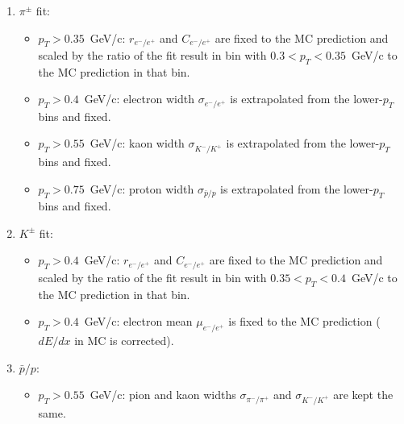 \begin{enumerate}
	\item $\pi^\pm$ fit:
	\begin{itemize}
		\item $p_T>0.35$~GeV/c: $r_{e^-/e^+}$ and $C_{e^-/e^+}$ are fixed to the MC prediction and scaled by the ratio of the fit result in bin with $0.3 < p_T < 0.35$~GeV/c to the MC prediction in that bin.
		\item $p_T>0.4$~GeV/c: electron width $\sigma_{e^-/e^+}$ is extrapolated from the lower-$p_T$ bins and fixed.
		\item $p_T>0.55$~GeV/c: kaon width $\sigma_{K^-/K^+}$ is extrapolated from the lower-$p_T$ bins and fixed.
		\item $p_T>0.75$~GeV/c: proton width $\sigma_{\bar{p}/p}$ is extrapolated from the lower-$p_T$ bins and fixed.
	\end{itemize}
	\item $K^\pm$ fit:
	\begin{itemize}
		\item $p_T>0.4$~GeV/c: $r_{e^-/e^+}$ and $C_{e^-/e^+}$ are fixed to the MC prediction and scaled by the ratio of the fit result in bin with $0.35 < p_T < 0.4$~GeV/c to the MC prediction in that bin.
		\item $p_T>0.4$~GeV/c: electron mean $\mu_{e^-/e^+}$ is fixed to the MC prediction ($dE/dx$ in MC is corrected\cite{commonnote}).
	\end{itemize}
	\item $\bar{p}/p$:
	\begin{itemize}
		\item $p_T>0.55$~GeV/c: pion  and kaon widths $\sigma_{\pi^-/\pi^+}$ and $\sigma_{K^-/K^+}$ are kept the same.
	\end{itemize}	
\end{enumerate}
